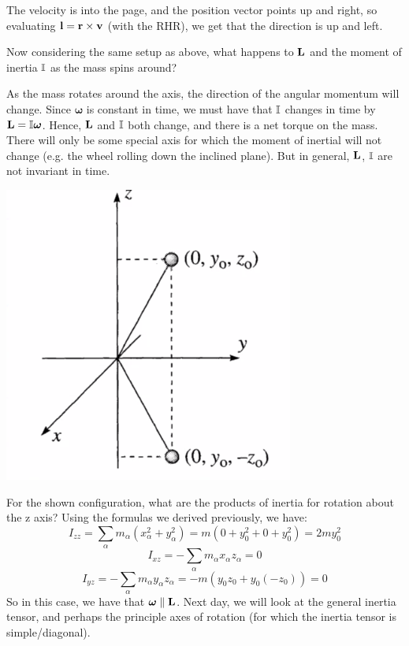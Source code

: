 \documentclass[../PHYS306Notes.tex]{subfiles}
\begin{document}
\begin{s}
The velocity is into the page, and the position vector points up and right, so evaluating $\mathbf{l} = \mathbf{r}\times\mathbf{v}$ (with the RHR), we get that the direction is up and left.
\end{s}
Now considering the same setup as above, what happens to $\mathbf{L}$ and the moment of inertia $\mathbb{I}$ as the mass spins around?
\begin{s}
As the mass rotates around the axis, the direction of the angular momentum will change. Since $\bm{\omega}$ is constant in time, we must have that $\mathbb{I}$ changes in time by $\mathbf{L} = \mathbb{I}\bm{\omega}$. Hence, $\mathbf{L}$ and $\mathbb{I}$ both change, and there is a net torque on the mass. There will only be some special axis for which the moment of inertial will not change (e.g. the wheel rolling down the inclined plane). But in general, $\mathbf{L}$, $\mathbb{I}$ are not invariant in time. 
\end{s}
\begin{center}
    \includegraphics[scale=0.5]{Lecture-17/l17-img7.png}
\end{center}
For the shown configuration, what are the products of inertia for rotation about the z axis? Using the formulas we derived previously, we have:
\[I_{zz} = \sum_\alpha m_\alpha(x_\alpha^2 + y_\alpha^2) = m(0 + y_0^2 + 0 + y_0^2) = 2my_0^2\]
\[I_{xz} = -\sum_\alpha m_\alpha x_\alpha z_\alpha = 0\]
\[I_{yz} = -\sum_{\alpha}m_\alpha y_\alpha z_\alpha = -m(y_0z_0 + y_0(-z_0)) = 0\]
So in this case, we have that $\bm{\omega} \parallel \mathbf{L}$. Next day, we will look at the general inertia tensor, and perhaps the principle axes of rotation (for which the inertia tensor is simple/diagonal).
\end{document}
